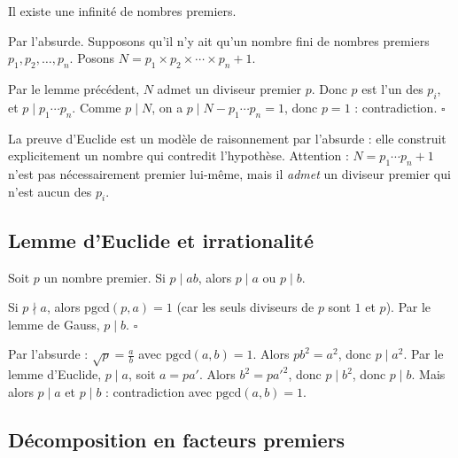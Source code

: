 \begin{thmbox}
Il existe une infinité de nombres premiers.
\end{thmbox}

\begin{proofbox}
Par l'absurde. Supposons qu'il n'y ait qu'un nombre fini de nombres premiers $p_1, p_2, \ldots, p_n$. Posons $N = p_1 \times p_2 \times \cdots \times p_n + 1$.

Par le lemme précédent, $N$ admet un diviseur premier $p$. Donc $p$ est l'un des $p_i$, et $p \mid p_1 \cdots p_n$. Comme $p \mid N$, on a $p \mid N - p_1 \cdots p_n = 1$, donc $p = 1$ : contradiction. \hfill$\square$
\end{proofbox}

\begin{intuitionbox}
La preuve d'Euclide est un modèle de raisonnement par l'absurde : elle construit explicitement un nombre qui contredit l'hypothèse. Attention : $N = p_1 \cdots p_n + 1$ n'est pas nécessairement premier lui-même, mais il \emph{admet} un diviseur premier qui n'est aucun des $p_i$.
\end{intuitionbox}

\subsection{Lemme d'Euclide et irrationalité}

\begin{propbox}
Soit $p$ un nombre premier. Si $p \mid ab$, alors $p \mid a$ ou $p \mid b$.
\end{propbox}

\begin{proofbox}
Si $p \nmid a$, alors $\text{pgcd}(p, a) = 1$ (car les seuls diviseurs de $p$ sont $1$ et $p$). Par le lemme de Gauss, $p \mid b$. \hfill$\square$
\end{proofbox}

\begin{exbox}
Par l'absurde : $\sqrt{p} = \frac{a}{b}$ avec $\text{pgcd}(a, b) = 1$. Alors $pb^2 = a^2$, donc $p \mid a^2$. Par le lemme d'Euclide, $p \mid a$, soit $a = pa'$. Alors $b^2 = pa'^2$, donc $p \mid b^2$, donc $p \mid b$. Mais alors $p \mid a$ et $p \mid b$ : contradiction avec $\text{pgcd}(a,b) = 1$.
\end{exbox}

\subsection{Décomposition en facteurs premiers}

